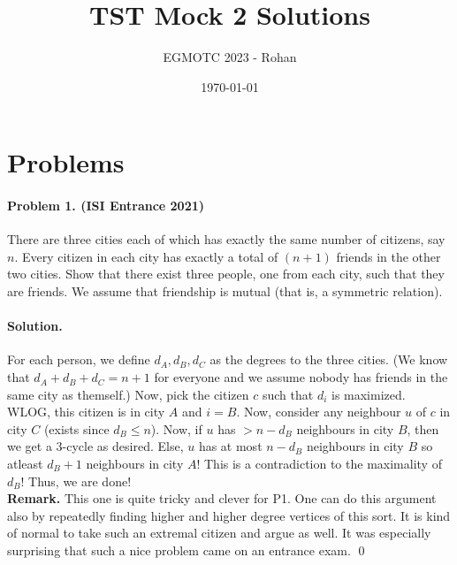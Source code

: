\documentclass[12pt]{article}
\title{TST Mock 2 Solutions}
\author{EGMOTC 2023 - Rohan}
\date{\today}
\newenvironment{solution}
{\paragraph{Solution.}}
{\qed\eject}
\begin{document}
\maketitle

\newcommand{\localtextbulletone}{\textcolor{black}{\raisebox{.45ex}{\rule{.6ex}{.6ex}}}}
\renewcommand{\labelitemi}{\localtextbulletone}

\section*{Problems}
\vspace{1cm}
\thispagestyle{empty}

\paragraph{\textbf{Problem 1. (ISI Entrance 2021)}} There are three cities each of which has exactly the same number of citizens, say $n$. Every citizen in each city has exactly a total of $(n+1)$ friends in the other two cities. Show that there exist three people, one from each city, such that they are friends. We assume that friendship is mutual (that is, a symmetric relation).

\begin{solution}
    For each person, we define $d_A, d_B, d_C$ as the degrees to the three cities. (We know that $d_A+d_B+d_C=n+1$ for everyone and we assume nobody has friends in the same city as themself.) Now, pick the citizen $c$ such that $d_i$ is maximized. WLOG, this citizen is in city $A$ and $i=B$. Now, consider any neighbour $u$ of $c$ in city $C$ (exists since $d_B\le n$). Now, if $u$ has $>n-d_B$ neighbours in city $B$, then we get a $3$-cycle as desired. Else, $u$ has at most $n-d_B$ neighbours in city $B$ so atleast $d_B+1$ neighbours in city $A$! This is a contradiction to the maximality of $d_B$! Thus, we are done!\\
    
    \textbf{Remark.} This one is quite tricky and clever for P1. One can do this argument also by repeatedly finding higher and higher degree vertices of this sort. It is kind of normal to take such an extremal citizen and argue as well. It was especially surprising that such a nice problem came on an entrance exam.
\end{solution}
\end{document}
